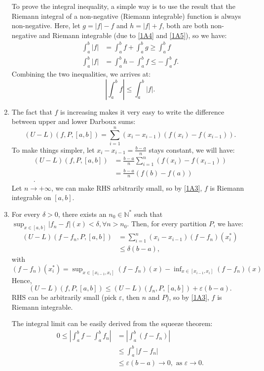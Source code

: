\begin{enumerate}[label=\textbf{1A.\arabic*}]
  To prove the integral inequality, a simple way is to use the result that the
  Riemann integral of a non-negative (Riemann integrable) function is always
  non-negative. Here, let \( g = |f| - f \) and \( h = |f| + f \), both are
  both non-negative and Riemann integrable (due to \ref{1A4} and \ref{1A5}), so
  we have:
  \begin{align*}
    \int _{a}^{b} |f| &= \int _{a}^{b} f + \int _{a}^{b} g \ge \int _{a}^{b} f\\
    \int _{a}^{b} |f| &= \int _{a}^{b} h - \int _{a}^{b} f \le -\int _{a}^{b} f
  .\end{align*}
  Combining the two inequalities, we arrives at:
  \[
    \left| \int _{a}^{b} f \right| \le \int _{a}^{b} |f|
  .\] 
\item The fact that \( f \) is increasing makes it very easy to write the
  difference between upper and lower Darboux sums:
  \[
    (U - L)(f, P, [a, b]) = \sum_{i = 1}^{n} (x_{i} - x_{i-1})(f(x_{i}) - f(x_{i
    - 1}))
  .\] 
  To make things simpler, let \( x_{i} - x_{i - 1} = \frac{b - a}{n} \) stays
  constant, we will have:
  \begin{align*}
    (U - L)(f, P, [a, b]) &= \frac{b-a}{n}\sum_{i = 1}^{n} (f(x_{i}) - f(x_{i-1})) \\
    &= \frac{b-a}{n} (f(b) - f(a)) \\
  .\end{align*}
  Let \( n \to +\infty \), we can make RHS arbitrarily small, so by \ref{1A3},
  \( f \) is Riemann integrable on \( [a, b] \).
\item For every \( \delta > 0 \), there exists an \( n_{0} \in
  \mathbb{N}^{*} \)  such that \( \sup_{x \in [a, b]} |f_{n} - f|(x) <
  \delta, \forall  n > n_{0} \).
  Then, for every partition \( P \), we have:
  \begin{align*}
    (U - L)(f - f_{n}, P, [a, b]) &= \sum_{i = 1}^{n} (x_{i} -
    x_{i-1})(f-f_{n})(x^{*}_{i}) \\
                                  &\le \delta(b-a)
                                ,\end{align*} with \( (f-f_{n})(x^{*}_{i}) =
                                \sup_{x \in[x_{i-1}, x_{i}]} (f-f_{n})(x) -
                                \inf_{x \in[x_{i-1}, x_{i}]} (f-f_{n})(x)\)
  Hence,
  \[
    (U - L)(f, P, [a, b]) \le (U - L)(f_{n}, P, [a, b]) + \varepsilon(b-a)
  .\] 
  RHS can be arbitrarily small (pick \( \varepsilon \), then \( n \) and \( P
  \)), so by \ref{1A3}, \( f \) is Riemann integrable.

  The integral limit can be easily derived from the squeeze theorem:
  \begin{align*}
    0\le \left| \int _{a}^{b} f - \int _{a}^{b} f_{n} \right| &=
    \left| \int _{a}^{b} (f - f_{n})\right| \\
&\le \int _{a}^{b} |f - f_{n}|\\
&\le \varepsilon(b - a) \to 0, \text{ as } \varepsilon \to 0
  .\end{align*}
\end{enumerate}

